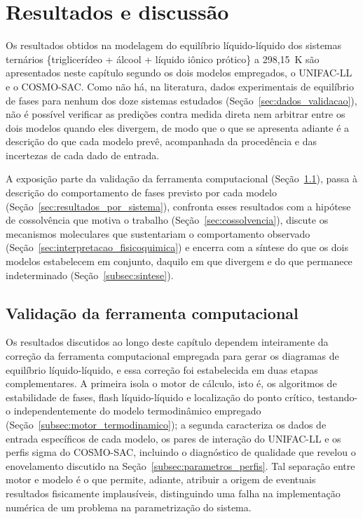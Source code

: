 
\chapter{Resultados e discussão}
\label{cap:resultados}

Os resultados obtidos na modelagem do equilíbrio líquido-líquido dos sistemas ternários \{triglicerídeo + álcool + líquido iônico prótico\} a 298,15~K são apresentados neste capítulo segundo os dois modelos empregados, o UNIFAC-LL e o COSMO-SAC. Como não há, na literatura, dados experimentais de equilíbrio de fases para nenhum dos doze sistemas estudados (Seção~\ref{sec:dados_validacao}), não é possível verificar as predições contra medida direta nem arbitrar entre os dois modelos quando eles divergem, de modo que o que se apresenta adiante é a descrição do que cada modelo prevê, acompanhada da procedência e das incertezas de cada dado de entrada.

A exposição parte da validação da ferramenta computacional (Seção~\ref{sec:validacao_computacional}), passa à descrição do comportamento de fases previsto por cada modelo (Seção~\ref{sec:resultados_por_sistema}), confronta esses resultados com a hipótese de cossolvência que motiva o trabalho (Seção~\ref{sec:cossolvencia}), discute os mecanismos moleculares que sustentariam o comportamento observado (Seção~\ref{sec:interpretacao_fisicoquimica}) e encerra com a síntese do que os dois modelos estabelecem em conjunto, daquilo em que divergem e do que permanece indeterminado (Seção~\ref{subsec:sintese}).

\section{Validação da ferramenta computacional}
\label{sec:validacao_computacional}

Os resultados discutidos ao longo deste capítulo dependem inteiramente da correção da ferramenta computacional empregada para gerar os diagramas de equilíbrio líquido-líquido, e essa correção foi estabelecida em duas etapas complementares. A primeira isola o motor de cálculo, isto é, os algoritmos de estabilidade de fases, flash líquido-líquido e localização do ponto crítico, testando-o independentemente do modelo termodinâmico empregado (Seção~\ref{subsec:motor_termodinamico}); a segunda caracteriza os dados de entrada específicos de cada modelo, os pares de interação do UNIFAC-LL e os perfis sigma do COSMO-SAC, incluindo o diagnóstico de qualidade que revelou o enovelamento discutido na Seção~\ref{subsec:parametros_perfis}. Tal separação entre motor e modelo é o que permite, adiante, atribuir a origem de eventuais resultados fisicamente implausíveis, distinguindo uma falha na implementação numérica de um problema na parametrização do sistema.

